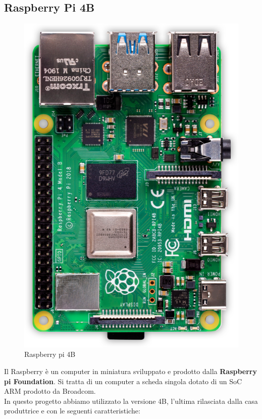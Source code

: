 \documentclass[12pt]{report}
\begin{document}
\subsection*{Raspberry Pi 4B}
\begin{figure}
\includegraphics[width=0.85\linewidth]{images/components/raspberry-pi-4.png} 
\caption{Raspberry pi 4B}
\label{fig:wrapfig}
\end{figure}
Il Raspberry è un computer in miniatura sviluppato e prodotto dalla \textbf{Raspberry pi Foundation}. Si tratta di un computer a scheda singola dotato di un SoC ARM  prodotto da Broadcom.\\ 
In questo progetto abbiamo utilizzato la versione 4B, l'ultima rilasciata dalla casa produttrice e con le seguenti caratteristiche:
\end{document}
